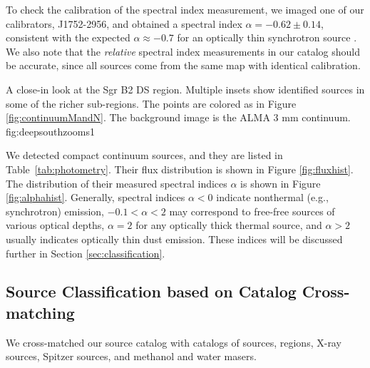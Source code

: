 \documentclass[twocolumn]{aastex61}
\begin{document}
To check the calibration of the spectral index measurement, we imaged one of
our calibrators, J1752-2956, and obtained a spectral index
$\alpha=-0.62\pm0.14$, consistent with the expected $\alpha\approx-0.7$ for an
optically thin synchrotron source \citep[e.g.,][]{Condon2007a}.  We also note
that the \emph{relative} spectral index measurements in our catalog should be
accurate, since all sources come from the same map with identical calibration.

{A close-in look at the Sgr B2 DS region.  Multiple insets show identified sources
in some of the richer sub-regions.  The points are colored as in Figure
\ref{fig:continuumMandN}.  The background image is the ALMA 3 mm continuum.}
{fig:deepsouthzooms}{1}{\textwidth}

We detected \ncores compact continuum sources, and they are listed
in Table~\ref{tab:photometry}.  Their flux distribution is
shown in Figure \ref{fig:fluxhist}.  The distribution of their measured
spectral indices $\alpha$ is shown in Figure \ref{fig:alphahist}.
Generally, spectral indices $\alpha<0$ indicate nonthermal (e.g., synchrotron)
emission, $-0.1<\alpha<2$ may correspond to free-free sources of various
optical depths, $\alpha=2$ for any optically thick thermal source,
and $\alpha>2$ usually indicates optically thin dust emission.  These indices
will be discussed further in Section \ref{sec:classification}.

\subsection{Source Classification based on Catalog Cross-matching}
\label{sec:crossmatch}
We cross-matched our source catalog with catalogs of \ammonia sources, \hii
regions, X-ray sources, Spitzer sources, and methanol and water masers.
\end{document}
